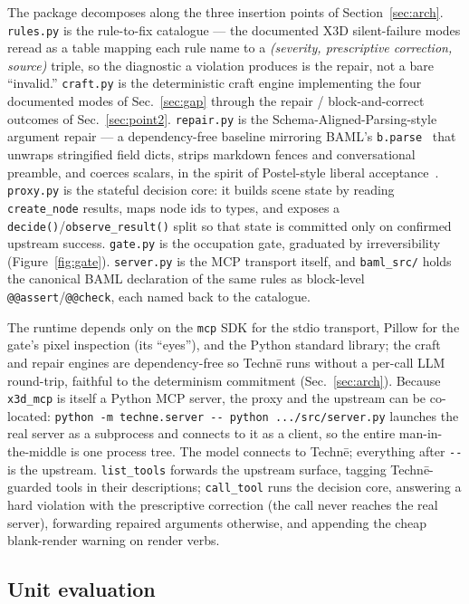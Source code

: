 \documentclass[sigconf,nonacm,screen,anonymous]{acmart}
\begin{document}
The package decomposes along the three insertion points of Section~\ref{sec:arch}. \texttt{rules.py} is the rule-to-fix catalogue --- the documented X3D silent-failure modes reread as a table mapping each rule name to a \emph{(severity, prescriptive correction, source)} triple, so the diagnostic a violation produces is the repair, not a bare ``invalid.'' \texttt{craft.py} is the deterministic craft engine implementing the four documented modes of Sec.~\ref{sec:gap} through the repair / block-and-correct outcomes of Sec.~\ref{sec:point2}. \texttt{repair.py} is the Schema-Aligned-Parsing-style argument repair --- a dependency-free baseline mirroring BAML's \texttt{b.parse}~\cite{baml} that unwraps stringified field dicts, strips markdown fences and conversational preamble, and coerces scalars, in the spirit of Postel-style liberal acceptance~\cite{postel}. \texttt{proxy.py} is the stateful decision core: it builds scene state by reading \texttt{create\_node} results, maps node ids to types, and exposes a \texttt{decide()}/\texttt{observe\_result()} split so that state is committed only on confirmed upstream success. \texttt{gate.py} is the occupation gate, graduated by irreversibility (Figure~\ref{fig:gate}). \texttt{server.py} is the MCP transport itself, and \texttt{baml\_src/} holds the canonical BAML declaration of the same rules as block-level \texttt{@@assert}/\texttt{@@check}, each named back to the catalogue.

The runtime depends only on the \texttt{mcp} SDK for the stdio transport, Pillow for the gate's pixel inspection (its ``eyes''), and the Python standard library; the craft and repair engines are dependency-free so Techn\=e runs without a per-call LLM round-trip, faithful to the determinism commitment (Sec.~\ref{sec:arch}). Because \texttt{x3d\_mcp} is itself a Python MCP server, the proxy and the upstream can be co-located: \texttt{python -m techne.server -{}- python .../src/server.py} launches the real server as a subprocess and connects to it as a client, so the entire man-in-the-middle is one process tree. The model connects to Techn\=e; everything after \texttt{-{}-} is the upstream. \texttt{list\_tools} forwards the upstream surface, tagging Techn\=e-guarded tools in their descriptions; \texttt{call\_tool} runs the decision core, answering a hard violation with the prescriptive correction (the call never reaches the real server), forwarding repaired arguments otherwise, and appending the cheap blank-render warning on render verbs.

\subsection{Unit evaluation}
\end{document}
